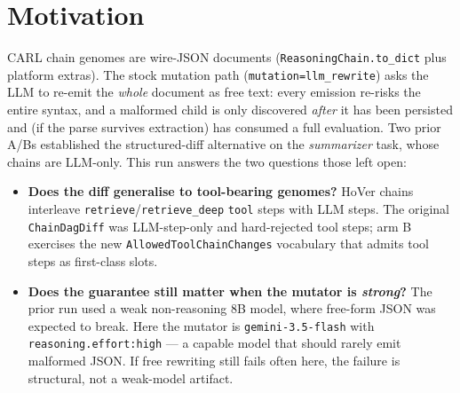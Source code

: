 \documentclass[11pt]{article}
\newcommand{\armB}{\textcolor{accent}{arm B}}
\begin{document}
\section{Motivation}
CARL chain genomes are wire-JSON documents (\texttt{ReasoningChain.to\_dict} plus platform
extras). The stock mutation path (\texttt{mutation=llm\_rewrite}) asks the LLM to re-emit the
\emph{whole} document as free text: every emission re-risks the entire syntax, and a malformed
child is only discovered \emph{after} it has been persisted and (if the parse survives
extraction) has consumed a full evaluation. Two prior A/Bs established the structured-diff
alternative on the \emph{summarizer} task, whose chains are LLM-only. This run answers the two
questions those left open:
\begin{itemize}
  \item \textbf{Does the diff generalise to tool-bearing genomes?} HoVer chains interleave
  \texttt{retrieve}/\texttt{retrieve\_deep} \texttt{tool} steps with LLM steps. The original
  \texttt{ChainDagDiff} was LLM-step-only and hard-rejected tool steps; \armB{} exercises the
  new \texttt{AllowedToolChainChanges} vocabulary that admits tool steps as first-class slots.
  \item \textbf{Does the guarantee still matter when the mutator is \emph{strong}?} The prior
  run used a weak non-reasoning 8B model, where free-form JSON was expected to break. Here the
  mutator is \texttt{gemini-3.5-flash} with \texttt{reasoning.effort:high} --- a capable model
  that should rarely emit malformed JSON. If free rewriting still fails often here, the failure
  is structural, not a weak-model artifact.
\end{itemize}
\end{document}
